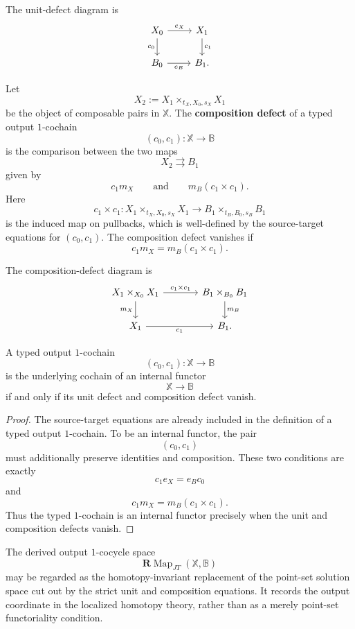 The unit-defect diagram is
\[
\begin{tikzcd}
X_0
\arrow[r, "e_X"]
\arrow[d, "c_0"']
&
X_1
\arrow[d, "c_1"]
\\
B_0
\arrow[r, "e_B"']
&
B_1.
\end{tikzcd}
\]

\begin{definition}
\label{def:composition-defect-rewritten}
Let
\[
X_2:=X_1\times_{t_X,X_0,s_X}X_1
\]
be the object of composable pairs in \(\mathbb X\). The
\textbf{composition defect} of a typed output \(1\)-cochain
\[
(c_0,c_1):\mathbb X\to\mathbb B
\]
is the comparison between the two maps
\[
X_2\rightrightarrows B_1
\]
given by
\[
c_1m_X
\qquad
\text{and}
\qquad
m_B(c_1\times c_1).
\]
Here
\[
c_1\times c_1:
X_1\times_{t_X,X_0,s_X}X_1
\longrightarrow
B_1\times_{t_B,B_0,s_B}B_1
\]
is the induced map on pullbacks, which is well-defined by the
source-target equations for \((c_0,c_1)\). The composition defect
vanishes if
\[
c_1m_X=m_B(c_1\times c_1).
\]
\end{definition}

The composition-defect diagram is
\[
\begin{tikzcd}[column sep=large]
X_1\times_{X_0}X_1
\arrow[r, "c_1\times c_1"]
\arrow[d, "m_X"']
&
B_1\times_{B_0}B_1
\arrow[d, "m_B"]
\\
X_1
\arrow[r, "c_1"']
&
B_1.
\end{tikzcd}
\]

\begin{proposition}
\label{prop:strict-cocycles-as-vanishing-defects-rewritten}
A typed output \(1\)-cochain
\[
(c_0,c_1):\mathbb X\to\mathbb B
\]
is the underlying cochain of an internal functor
\[
\mathbb X\to\mathbb B
\]
if and only if its unit defect and composition defect vanish.
\end{proposition}

\begin{proof}
The source-target equations are already included in the definition of a
typed output \(1\)-cochain. To be an internal functor, the pair
\[
(c_0,c_1)
\]
must additionally preserve identities and composition. These two
conditions are exactly
\[
c_1e_X=e_Bc_0
\]
and
\[
c_1m_X=m_B(c_1\times c_1).
\]
Thus the typed \(1\)-cochain is an internal functor precisely when the
unit and composition defects vanish.
\end{proof}

\begin{remark}
\label{rem:derived-correction-defects-rewritten}
The derived output \(1\)-cocycle space
\[
\mathbf R\!\operatorname{Map}_{JT}(\mathbb X,\mathbb B)
\]
may be regarded as the homotopy-invariant replacement of the point-set
solution space cut out by the strict unit and composition equations. It
records the output coordinate in the localized homotopy theory, rather
than as a merely point-set functoriality condition.
\end{remark}

